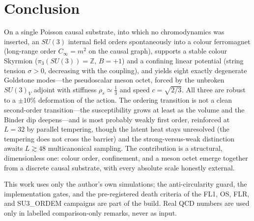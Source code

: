 \documentclass[aps,prd,reprint,nofootinbib,superscriptaddress,floatfix]{revtex4-2}
\begin{document}
\section{Conclusion}\label{sec:conclusion}

On a single Poisson causal substrate, into which no chromodynamics was inserted, an $SU(3)$
internal field orders spontaneously into a colour ferromagnet (long-range order $C_\infty=m^2$
on the causal graph), supports a stable colour Skyrmion ($\pi_3(SU(3))=\mathbb{Z}$, $B=+1$) and
a confining linear potential (string tension $\sigma>0$, decreasing with the coupling), and
yields eight exactly degenerate Goldstone modes---the pseudoscalar meson octet, forced by the
unbroken $SU(3)_V$ adjoint with stiffness $\rho_s\simeq\tfrac13$ and speed $c=\sqrt{2/3}$. All
three are robust to a $\pm10\%$ deformation of the action. The ordering transition is not a
clean second-order transition---the susceptibility grows at least as the volume and the Binder
dip deepens---and is most probably weakly first order, reinforced at $L=32$ by parallel
tempering, though the latent heat stays unresolved (the tempering does not cross the barrier)
and the strong-versus-weak distinction awaits $L\gtrsim48$ multicanonical sampling. The contribution is a
structural, dimensionless one: colour order, confinement, and a meson octet emerge together
from a discrete causal substrate, with every absolute scale honestly external.

\begin{acknowledgments}
This work uses only the author's own simulations; the anti-circularity guard, the
implementation gates, and the pre-registered death criteria of the FL1, OS, FLR, and
SU3\_ORDEM campaigns are part of the build. Real QCD numbers are used only in labelled
comparison-only remarks, never as input.
\end{acknowledgments}



\end{document}
